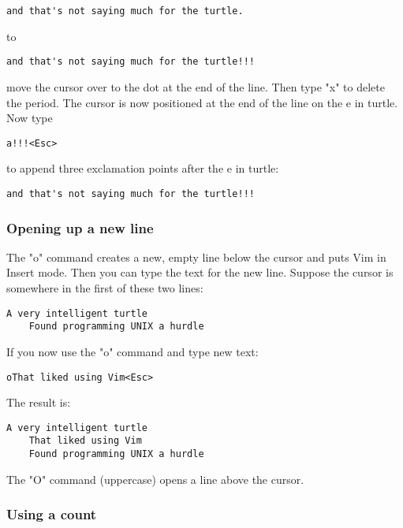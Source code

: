 		\begin{Verbatim}[samepage=true]
    and that's not saying much for the turtle. 
		\end{Verbatim}
to
		\begin{Verbatim}[samepage=true]
    and that's not saying much for the turtle!!! 
		\end{Verbatim}

move the cursor over to the dot at the end of the line. Then type "x" to delete the period.
The cursor is now positioned at the end of the line on the e in turtle.
Now type 

	\begin{Verbatim}[samepage=true]
	a!!!<Esc>
	\end{Verbatim}

to append three exclamation points after the e in turtle:

	\begin{Verbatim}[samepage=true]
	and that's not saying much for the turtle!!! 
	\end{Verbatim}

\subsubsection{Opening up a new line}

The "o" command creates a new, empty line below the cursor and puts Vim in Insert mode.
Then you can type the text for the new line.
Suppose the cursor is somewhere in the first of these two lines: 

		\begin{Verbatim}[samepage=true]
    A very intelligent turtle 
    Found programming UNIX a hurdle 
		\end{Verbatim}

If you now use the "o" command and type new text:

		\begin{Verbatim}[samepage=true]
		oThat liked using Vim<Esc>
		\end{Verbatim}

The result is:

		\begin{Verbatim}[samepage=true]
    A very intelligent turtle 
    That liked using Vim 
    Found programming UNIX a hurdle 
		\end{Verbatim}

The "O" command (uppercase) opens a line above the cursor.

\subsubsection{Using a count}


